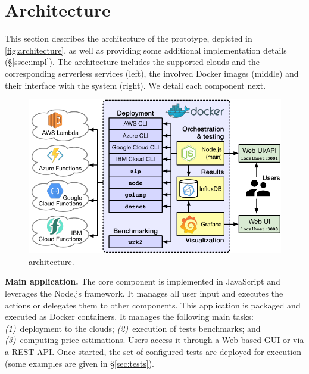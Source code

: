 \section{Architecture}
\label{sec:architecture}

This section describes the architecture of the \sys prototype, depicted in \autoref{fig:architecture}, as well as providing some additional implementation details (\S\ref{ssec:impl}).
The architecture includes the supported clouds and the corresponding serverless services (left), the involved Docker images (middle) and their interface with the system (right).
We detail each component next. 

\begin{figure}[!t]
\begin{center}
\includegraphics[scale=0.7]{bilder/archi}
\caption{\sys architecture.}
\label{fig:architecture}
\end{center}
\end{figure}

\textbf{Main application.}
The \sys core component is implemented in JavaScript and leverages the Node.js framework. 
It manages all user input and executes the actions or delegates them to other components. 
This application is packaged and executed as Docker containers. 
It manages the following main tasks:
\emph{(1)}~deployment to the clouds;
\emph{(2)}~execution of tests benchmarks; and
\emph{(3)}~computing price estimations. 
Users access it through a Web-based \gls{GUI} or via a REST \gls{API}. 
Once started, the set of configured tests are deployed for execution (some examples are given in \S\ref{sec:tests}).

